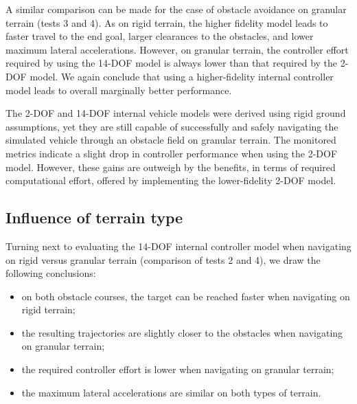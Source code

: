 \documentclass[12pt,twocolumn]{article}
\newcommand{\CHRONO}{{\sffamily{{Chrono}}}}
\begin{document}
A similar comparison can be made for the case of obstacle avoidance on granular terrain (tests 3 and 4).  As on rigid terrain, the higher fidelity model leads to faster travel to the end goal, larger clearances to the obstacles, and lower maximum lateral accelerations.  However, on granular terrain, the controller effort required by using the 14-DOF model is always lower than that required by the 2-DOF model.  We again conclude that using a higher-fidelity internal controller model leads to overall marginally better performance.

%
%

The 2-DOF and 14-DOF internal vehicle models were derived using rigid ground assumptions, yet they are still capable of successfully and safely navigating the simulated vehicle through an obstacle field on granular terrain. The monitored metrics indicate a slight drop in controller performance when using the 2-DOF model. However, these gains are outweigh by the benefits, in terms of required computational effort, offered by implementing the lower-fidelity 2-DOF model. 

\subsection{Influence of terrain type}

Turning next to evaluating the 14-DOF internal controller model when navigating on rigid versus granular terrain (comparison of tests 2 and 4), we draw the following conclusions:
\begin{itemize}
\item on both obstacle courses, the target can be reached faster when navigating on rigid terrain;
\item the resulting trajectories are slightly closer to the obstacles when navigating on granular terrain;
\item the required controller effort is lower when navigating on granular terrain;
\item the maximum lateral accelerations are similar on both types of terrain.
\end{itemize}
\end{document}
